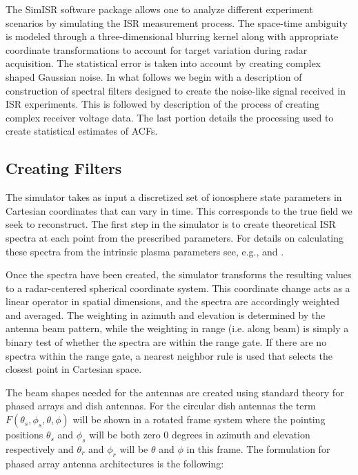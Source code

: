 \documentclass[draft,ras]{agutex}
\begin{document}
\begin{article}
The SimISR software package allows one to analyze different  experiment scenarios by simulating the ISR measurement process. %
The space-time ambiguity is modeled through a three-dimensional blurring kernel along with appropriate coordinate transformations to account for target variation during radar acquisition.   The statistical error is taken into account by creating complex shaped Gaussian noise.    
In what follows we begin with a description of construction of spectral filters designed to create the noise-like signal received in ISR experiments. This is followed by description of the process of creating complex receiver voltage data. The last portion details the processing used to create statistical estimates of ACFs.

\subsection{Creating Filters}

The simulator takes as input a discretized set of ionosphere state parameters in Cartesian coordinates that can vary in time.  This corresponds to the true field we seek to reconstruct. The first step in the simulator is to create theoretical ISR spectra at each point from the prescribed parameters. For details on calculating these spectra from the intrinsic plasma parameters see, e.g., \citet{kudeki:milla:1} and \citet{kudeki:milla:2}. 

Once the spectra have been created, the simulator transforms the resulting values to a radar-centered spherical coordinate system. This coordinate change acts as a linear operator in spatial dimensions, and the spectra are accordingly weighted and averaged. The weighting in azimuth and elevation is determined by the antenna beam pattern, while the weighting in range (i.e. along beam) is simply a binary test of whether the spectra are within the range gate. If there are no spectra within the range gate, a nearest neighbor rule is used that selects the closest point in Cartesian space. 

The beam shapes needed for the antennas are created using standard theory for phased arrays and dish antennas. For the circular dish antennas the term $F(\theta_s,\phi_s,\theta,\phi)$ will be shown in a rotated frame system where the pointing positions $\theta_s$ and $\phi_s$ will be both zero 0 degrees in azimuth and elevation respectively and $\theta_r$ and $\phi_r$ will be $\theta$ and $\phi$ in this frame. The formulation for phased array antenna architectures is the following:


\end{article}
\end{document}
